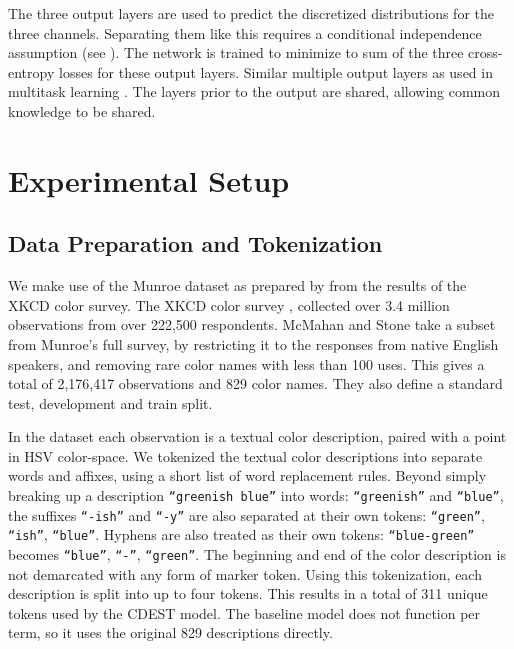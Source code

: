 \documentclass[11pt,a4paper]{article}
\newcommand{\parencite}{\citep}
\newcommand{\textcite}{\citet}
\begin{document}
The three output layers are used to predict the discretized distributions for the three channels.
Separating them like this requires a conditional independence assumption (see ).
The network is trained to minimize to sum of the three cross-entropy losses for these output layers.
Similar multiple output layers as used in multitask learning \parencite{caruana1997multitask,collobert2008unified}.
The layers prior to the output are shared, allowing common knowledge to be shared.


\section{Experimental Setup}\label{sec:experimental-setup}
\subsection{Data Preparation and Tokenization}\label{sec:data-preparation}
We make use of the  Munroe dataset as prepared by \textcite{mcmahan2015bayesian} from the results of the XKCD color survey.
The XKCD color survey \parencite{Munroe2010XKCDdataset}, collected over 3.4 million observations from over 222,500 respondents.
McMahan and Stone take a subset from Munroe's full survey, by restricting it to the responses from native English speakers, 
and removing rare color names with less than 100 uses.
This gives a total of 2,176,417 observations and 829 color names. 
They also define a standard test, development and train split.


In the dataset each observation is a textual color description, paired with a point in HSV color-space.
We tokenized the textual color descriptions into separate words and affixes, using a short list of word replacement rules.
Beyond simply breaking up a description \texttt{``greenish blue''} into words: \texttt{``greenish''} and \texttt{``blue''}, the suffixes \texttt{``-ish''} and \texttt{``-y''} are also separated at their own tokens: \texttt{``green''}, \texttt{``ish''}, \texttt{``blue''}.
Hyphens are also treated as their own tokens: \texttt{``blue-green''} becomes \texttt{``blue''}, \texttt{``-''}, \texttt{``green''}.
The beginning and end of the color description is not demarcated with any form of marker token.
Using this tokenization, each description is split into up to four tokens.
This results in a total of 311 unique tokens used by the CDEST model.
The baseline model does not function per term, so it uses the original 829 descriptions directly.
\end{document}
